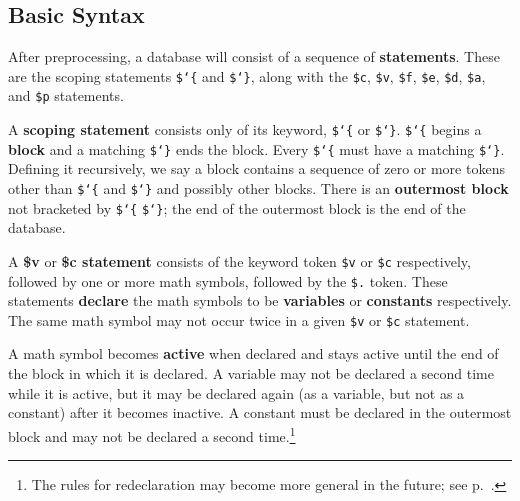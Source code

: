 \subsection{Basic Syntax}

After preprocessing, a database will consist of a sequence of {\bf
statements}.
These are the scoping statements \texttt{\$\char`\{} and
\texttt{\$\char`\}}, along with the \texttt{\$c}, \texttt{\$v},
\texttt{\$f}, \texttt{\$e}, \texttt{\$d}, \texttt{\$a}, and \texttt{\$p}
statements.

A {\bf scoping statement} consists only of its
keyword, \texttt{\$\char`\{} or \texttt{\$\char`\}}. \texttt{\$\char`\{} begins a {\bf
block} and a matching \texttt{\$\char`\}} ends the block. Every \texttt{\$\char`\{}
must have a matching \texttt{\$\char`\}}. Defining it recursively, we say a block
contains a sequence of zero or more tokens other
than \texttt{\$\char`\{} and \texttt{\$\char`\}} and
possibly other blocks.  There is an {\bf outermost
block} not bracketed by \texttt{\$\char`\{} \texttt{\$\char`\}}; the end
of the outermost block is the end of the database.


A {\bf \$v} or {\bf \$c statement} consists of the keyword token \texttt{\$v} or \texttt{\$c} respectively,
followed by one or more math symbols,
followed by the \texttt{\$.} token.
These
statements {\bf declare} the math symbols to be {\bf
variables} or {\bf constants}
respectively. The same math symbol may not occur twice in a given \texttt{\$v} or
\texttt{\$c} statement.


A math symbol becomes {\bf active} when declared
and stays active until the end of the block in which it is declared.  A
variable may not be declared a second time while it is active, but it
may be declared again (as a variable, but not as a constant) after it
becomes inactive.  A constant must be declared in the outermost block and may
not be declared a second time.\footnote{The rules for redeclaration may
become more general in the future;
see p.~\pageref{redeclarationf}.}


